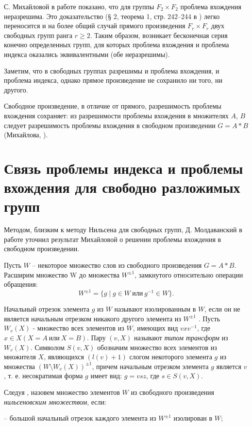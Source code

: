 \documentclass[twoside]{mfitjournal}
\begin{document}
С. Михайловой в работе \cite{Mikh1} показано, что для группы $F_2 \times F_2$ проблема вхождения неразрешима.  Это доказательство (§ 2, теорема 1, стр.  242–244  в \cite{Mikh1})  легко переносится и на более общий случай прямого произведения $F_r \times F_r$  двух свободных групп ранга $r\geq 2$. Таким образом, возникает бесконечная серия конечно определенных групп, для которых проблема вхождения и проблема индекса оказались эквивалентными (обе неразрешимы).

Заметим, что в свободных группах разрешимы и проблема вхождения, и проблема индекса, однако прямое произведение не сохранило ни того, ни другого.

Свободное произведение, в отличие от прямого, разрешимость проблемы вхождения сохраняет: из разрешимости проблемы вхождения в множителях $A$, $B$  следует разрешимость  проблемы вхождения  в свободном произведении $G = A\ast B$ (Михайлова, \cite{Mikh2}).

\section*{Связь проблемы индекса и проблемы вхождения для свободно разложимых групп}

Методом, близким к методу Нильсена для свободных групп, Д. Молдаванский  в работе \cite{Mol1} уточнил результат Михайловой о решении проблемы вхождения в свободном произведении. 

Пусть $W$ -- некоторое множество слов из свободного произведения $G = A\ast B$. Расширим множество W до множества $W^{\pm 1}$, замкнутого относительно операции обращения:
\[
W^{\pm 1}=\{g \mid g \in W ~\text{или}~ g^{-1} \in W \}.
\]

Начальный отрезок элемента $g$ из $W$ называют изолированным в $W$, если он не является начальным отрезком никакого другого элемента из $W^{\pm 1}$ . Пусть $W_v(X)$ - множество всех элементов из $W$, имеющих вид $vxv^{-1}$, где $x\in X (X = A~\text{или}~X = B)$. Пару $(v, X)$ называют \textit{типом трансформ} из $W_v(X)$. Символом $S(v, X)$ обозначим множество всех элементов из множителя $X$, являющихся $(l(v)+1)$ слогом некоторого элемента $g$ из множества $(W\setminus W_v(X))^{\pm 1}$, причем начальным отрезком элемента $g$ является $v$, т. е. несократимая форма $g$ имеет вид: $g = vsz$, где $s \in S(v, X)$.

Следуя \cite{Gor5}, назовем множество элементов $W$ из свободного произведения \textit{нильсеновским множеством}, если:

– большой начальный отрезок каждого элемента из $W^{\pm 1}$ изолирован в $W$;
\end{document}
